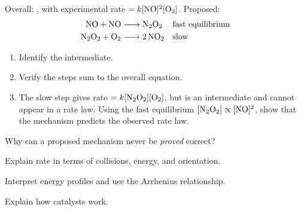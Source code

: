 \documentclass{apchem-notes}
\begin{document}

Overall: , with experimental
rate $= k[\ce{NO}]^2[\ce{O2}]$. Proposed:
\begin{align*}
  \ce{NO + NO &-> N2O2} &&\text{fast equilibrium}\\
  \ce{N2O2 + O2 &-> 2 NO2} &&\text{slow}
\end{align*}

\begin{enumerate}[leftmargin=*,itemsep=0.4em]
  \item Identify the intermediate.
  \item Verify the steps sum to the overall equation.
  \item The slow step gives rate $= k[\ce{N2O2}][\ce{O2}]$, but
         is an intermediate and cannot appear in a rate law.
        Using the fast equilibrium $[\ce{N2O2}] \propto [\ce{NO}]^2$,
        show that the mechanism predicts the observed rate law.
\end{enumerate}

\begin{exitticket}
Why can a proposed mechanism never be \emph{proved} correct?
\end{exitticket}


\begin{objectives}
  \item Explain rate in terms of collisions, energy, and orientation.
  \item Interpret energy profiles and use the Arrhenius relationship.
  \item Explain how catalysts work.
\end{objectives}

\end{document}
